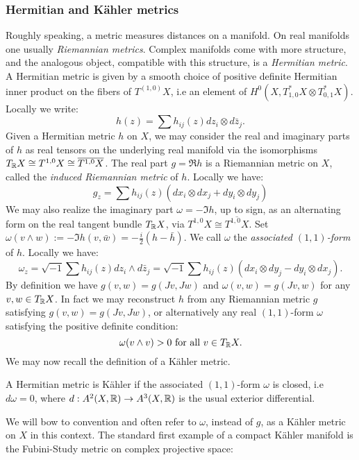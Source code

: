 \subsubsection{Hermitian and K\"ahler metrics}
Roughly speaking, a metric measures distances on a manifold. On real manifolds one usually \textit{Riemannian metrics}. Complex manifolds come with more structure, and the analogous object, compatible with this structure, is a \textit{Hermitian metric}. A Hermitian metric is given by a smooth choice of positive definite Hermitian inner product on the fibers of \(T^{(1,0)}X\), i.e an element of \(H^0(X, T^*_{1,0} X \otimes T^*_{0,1} X) \). Locally we write:
\[
h(z) = \sum h_{ij}(z) dz_i \otimes d\bar{z}_j.
\]
Given a Hermitian metric \(h\) on \(X\), we may consider the real and imaginary parts of \(h\) as real tensors on the underlying real manifold via the isomorphisms \(T_{\mathbb{R}} X \cong T^{1,0}X \cong \overline{T^{1,0}X}\). The real part \(g = \Re h\) is a Riemannian metric on \(X\), called the \textit{induced Riemannian metric} of \(h\). Locally we have:
\[
g_z = \sum h_{ij}(z) ( dx_i \otimes d x_j + dy_i \otimes dy_j)
\]
We may also realize the imaginary part \(\omega = - \Im h\), up to sign, as an alternating form on the real tangent bundle \(T_{\mathbb{R}} X\), via \(T^{1,0}X \cong \overline{T^{1,0}X}\). Set \(\omega ( v \wedge w ) :=  - \Im h(v, \bar{w}) = - \frac{i}{2} ( h - \bar{h} )  \). We call \(\omega\) the \textit{associated \((1,1)\)-form} of \(h\). Locally we have:
\[
\omega_z = \sqrt{-1} \sum h_{ij}(z) dz_i \wedge d\bar{z}_j = \sqrt{-1} \sum h_{ij}(z) ( dx_i \otimes dy_j - dy_i \otimes dx_j). 
\]
By definition we have \(g(v,w) = g(Jv,Jw)\) and \(\omega(v,w) = g(Jv,w) \) for any \(v,w \in T_{\mathbb{R}} X\). In fact we may reconstruct \(h\) from any Riemannian metric \(g\) satisfying \(g(v,w) = g(Jv,Jw)\), or alternatively any real \((1,1)\)-form \(\omega\) satisfying the positive definite condition:
\[
\omega( v \wedge v)  > 0 \text{ for all } v \in T_{\mathbb{R}} X.
\]
We may now recall the definition of a K\"ahler metric.
\begin{definition}
A Hermitian metric is K\"ahler if the associated \((1,1)\)-form \(\omega\) is closed, i.e \(d \omega = 0\), where \(d: A^2(X,\mathbb{R}) \to A^3(X,\mathbb{R})\) is the usual exterior differential.
\end{definition}
We will bow to convention and often refer to \(\omega\), instead of \(g\), as a K\"ahler metric on \(X\) in this context. The standard first example of a compact K\"ahler manifold is the Fubini-Study metric on complex projective space:
